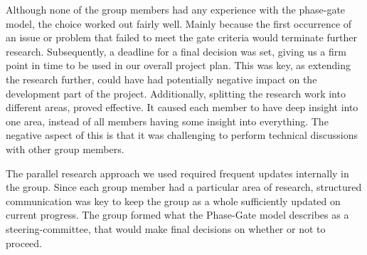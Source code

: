 Although none of the group members had any experience with the phase-gate model, the choice worked out fairly well. Mainly because the first occurrence of an issue or problem that failed to meet the gate criteria would terminate further research. Subsequently, a deadline for a final decision was set, giving us a firm point in time to be used in our overall project plan. This was key, as extending the research further, could have had potentially negative impact on the development part of the project. Additionally, splitting the research work into different areas, proved effective. It caused each member to have deep insight into one area, instead of all members having some insight into everything. The negative aspect of this is that it was challenging to perform technical discussions with other group members.

The parallel research approach we used required frequent updates internally in the group. Since each group member had a particular area of research, structured communication was key to keep the group as a whole sufficiently updated on current progress. The group formed what the Phase-Gate model describes as a steering-committee, that would make final decisions on whether or not to proceed.


